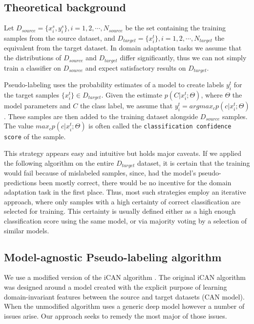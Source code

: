 \documentclass[12pt, a4paper]{article}
\begin{document}
	\subsection{Theoretical background}
	
	
	Let $D_{source} = \{x_i^s, y_i^s\}, i=1,2,\cdots, N_{source}$ be the set containing the training samples from the source dataset, and $D_{target} = \{x_i^t\}, i=1,2,\cdots, N_{target}$ the equivalent from the target dataset. In domain adaptation tasks we assume that the distributions of $D_{source}$ and $D_{target}$ differ significantly, thus we can not simply train a classifier on $D_{source}$ and expect satisfactory results on $D_{target}$.
	
	Pseudo-labeling uses the probability estimates of a model to create labels $y_i^t$ for the target samples $\{x_i^t\} \in D_{target}$. Given the estimate $p(C | x_i^t; \Theta)$, where $\Theta$ the model parameters and $C$ the class label, we assume that $y_i^t = argmax_c{p(c | x_i^t; \Theta)}$. These samples are then added to the training dataset alongside $D_{source}$ samples. The value $max_c{p(c | x_i^t; \Theta)}$ is often called the \texttt{classification confidence score} of the sample. 
	
	This strategy appears easy and intuitive but holds major caveats. If we applied the following algorithm on the entire $D_{target}$ dataset, it is certain that the training would fail because of mislabeled samples, since, had the model's pseudo-predictions been mostly correct, there would be no incentive for the domain adaptation task in the first place. Thus, most such strategies employ an iterative approach, where only samples with a high certainty of correct classification are selected for training. This certainty is usually defined either as a high enough classification score using the same model, or via majority voting by a selection of similar models.
	
	
	\subsection{Model-agnostic Pseudo-labeling algorithm}
	\label{ssec:our-algorithm}
	
	We use a modified version of the iCAN algorithm \parencite{ican}. The original iCAN algorithm was designed around a model created with the explicit purpose of learning domain-invariant features between the source and target datasets (CAN model). When the unmodified algorithm uses a generic deep model however a number of issues arise. Our approach seeks to remedy the most major of those issues.
	
\end{document}
